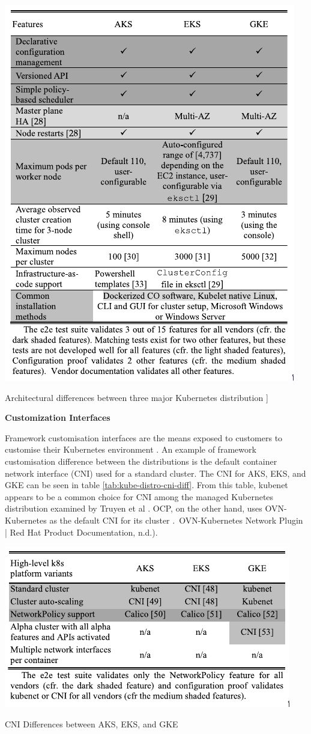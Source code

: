 \begin{table}
    \centering
    \includegraphics[width=0.5\linewidth]{resources/Pasted image 20241123075148.png}
    \caption{Architectural differences between three major Kubernetes distribution ]\cite{truyen_managing_2020}}
    \label{tab:architecture-diff-k8s-distro}
\end{table}

\textbf{Customization Interfaces}

Framework customisation interfaces are the means exposed to customers to customise their Kubernetes environment \cite{truyen_managing_2020}. An example of framework customisation difference between the distributions is the default container network interface (CNI) used for a standard cluster. The CNI for AKS, EKS, and GKE can be seen in table \ref{tab:kube-distro-cni-diff}. From this table, kubenet appears to be a common choice for CNI among the managed Kubernetes distribution examined by Truyen et al \cite{truyen_managing_2020}. OCP, on the other hand, uses OVN-Kubernetes as the default CNI for its cluster \cite{noauthor_chapter_nodate}. OVN-Kubernetes Network Plugin | Red Hat Product Documentation, n.d.).

\begin{table}
    \centering
    \includegraphics[width=0.5\linewidth]{resources/Pasted image 20241123082858.png}
    \caption{CNI Differences between AKS, EKS, and GKE \cite{truyen_managing_2020}}
    \label{tab:kube-distro-cni-diff}
\end{table}



